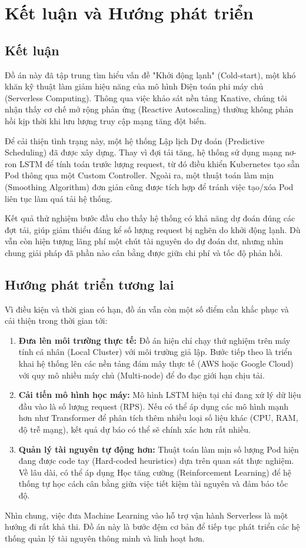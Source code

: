 \section{Kết luận và Hướng phát triển}

\subsection{Kết luận}
Đồ án này đã tập trung tìm hiểu vấn đề "Khởi động lạnh" (Cold-start), một khó khăn kỹ thuật làm giảm hiệu năng của mô hình Điện toán phi máy chủ (Serverless Computing). Thông qua việc khảo sát nền tảng Knative, chúng tôi nhận thấy cơ chế mở rộng phản ứng (Reactive Autoscaling) thường không phản hồi kịp thời khi lưu lượng truy cập mạng tăng đột biến.

Để cải thiện tình trạng này, một hệ thống Lập lịch Dự đoán (Predictive Scheduling) đã được xây dựng. Thay vì đợi tải tăng, hệ thống sử dụng mạng nơ-ron LSTM để tính toán trước lượng request, từ đó điều khiển Kubernetes tạo sẵn Pod thông qua một Custom Controller. Ngoài ra, một thuật toán làm mịn (Smoothing Algorithm) đơn giản cũng được tích hợp để tránh việc tạo/xóa Pod liên tục làm quá tải hệ thống.

Kết quả thử nghiệm bước đầu cho thấy hệ thống có khả năng dự đoán đúng các đợt tải, giúp giảm thiểu đáng kể số lượng request bị nghẽn do khởi động lạnh. Dù vẫn còn hiện tượng lãng phí một chút tài nguyên do dự đoán dư, nhưng nhìn chung giải pháp đã phần nào cân bằng được giữa chi phí và tốc độ phản hồi.

\subsection{Hướng phát triển tương lai}
Vì điều kiện và thời gian có hạn, đồ án vẫn còn một số điểm cần khắc phục và cải thiện trong thời gian tới:

\begin{enumerate}
    \item \textbf{Đưa lên môi trường thực tế:} Đồ án hiện chỉ chạy thử nghiệm trên máy tính cá nhân (Local Cluster) với môi trường giả lập. Bước tiếp theo là triển khai hệ thống lên các nền tảng đám mây thực tế (AWS hoặc Google Cloud) với quy mô nhiều máy chủ (Multi-node) để đo đạc giới hạn chịu tải.
    \item \textbf{Cải tiến mô hình học máy:} Mô hình LSTM hiện tại chỉ đang xử lý dữ liệu đầu vào là số lượng request (RPS). Nếu có thể áp dụng các mô hình mạnh hơn như Transformer để phân tích thêm nhiều loại số liệu khác (CPU, RAM, độ trễ mạng), kết quả dự báo có thể sẽ chính xác hơn rất nhiều.
    \item \textbf{Quản lý tài nguyên tự động hơn:} Thuật toán làm mịn số lượng Pod hiện đang được code tay (Hard-coded heuristics) dựa trên quan sát thực nghiệm. Về lâu dài, có thể áp dụng Học tăng cường (Reinforcement Learning) để hệ thống tự học cách cân bằng giữa việc tiết kiệm tài nguyên và đảm bảo tốc độ.
\end{enumerate}

Nhìn chung, việc đưa Machine Learning vào hỗ trợ vận hành Serverless là một hướng đi rất khả thi. Đồ án này là bước đệm cơ bản để tiếp tục phát triển các hệ thống quản lý tài nguyên thông minh và linh hoạt hơn.